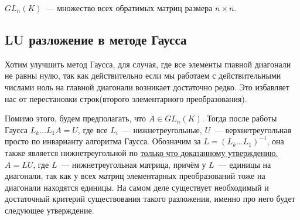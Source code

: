 \begin{definition}
    $GL_n(K)$~--- множество всех обратимых матриц размера $n\times n$.
\end{definition}
\subsection{LU разложение в методе Гаусса}
Хотим улучшить метод Гаусса, для случая, где все элементы главной
диагонали не равны нулю, так как действительно если мы работаем с действительными числами ноль на главной
диагонали возникает достаточно редко. Это избавляет нас от перестановки строк(второго элементарного преобразования).

Помимо этого, будем предполагать, что $A\in GL_n(K)$.
Тогда после работы Гаусса $L_k\ldots L_1A = U$, где все $L_i$~--- нижнетреугольные,
$U$~--- верхнетреугольная просто по инварианту алгоритма Гаусса.
Обозначим за $L = (L_k\ldots L_1)^{-1}$, она также является нижнетреугольной по 
\hyperref[stm:Обратная матрица к нижнетреугольной также нижнетреугольная]{только что доказанному утверждению.}
$A = LU$, где $L$~--- нижнетреугольная матрица, причём у $L$~--- единицы на диагонали, так как у всех матриц элементарных
преобразований тоже на диагонали находятся единицы.
На самом деле существует необходимый и достаточный критерий существования такого разложения, именно про него будет
следующее утверждение.

